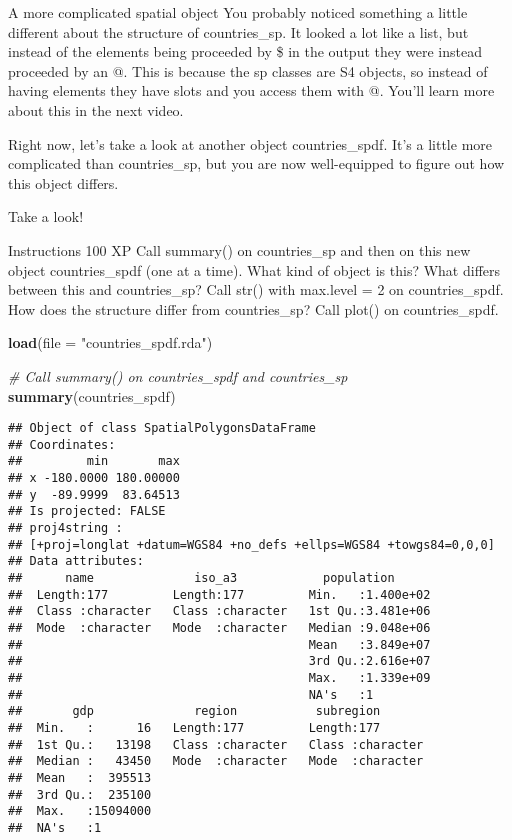\documentclass[]{article}
\newenvironment{Shaded}{\begin{snugshade}}{\end{snugshade}}
\newcommand{\CommentTok}[1]{\textcolor[rgb]{0.56,0.35,0.01}{\textit{#1}}}
\newcommand{\DataTypeTok}[1]{\textcolor[rgb]{0.13,0.29,0.53}{#1}}
\newcommand{\KeywordTok}[1]{\textcolor[rgb]{0.13,0.29,0.53}{\textbf{#1}}}
\newcommand{\NormalTok}[1]{#1}
\newcommand{\StringTok}[1]{\textcolor[rgb]{0.31,0.60,0.02}{#1}}
\begin{document}
A more complicated spatial object You probably noticed something a
little different about the structure of countries\_sp. It looked a lot
like a list, but instead of the elements being proceeded by \$ in the
output they were instead proceeded by an @. This is because the sp
classes are S4 objects, so instead of having elements they have slots
and you access them with @. You'll learn more about this in the next
video.

Right now, let's take a look at another object countries\_spdf. It's a
little more complicated than countries\_sp, but you are now
well-equipped to figure out how this object differs.

Take a look!

Instructions 100 XP Call summary() on countries\_sp and then on this new
object countries\_spdf (one at a time). What kind of object is this?
What differs between this and countries\_sp? Call str() with max.level =
2 on countries\_spdf. How does the structure differ from countries\_sp?
Call plot() on countries\_spdf.

\begin{Shaded}
\begin{Highlighting}[]
\KeywordTok{load}\NormalTok{(}\DataTypeTok{file =} \StringTok{"countries_spdf.rda"}\NormalTok{)}

\CommentTok{# Call summary() on countries_spdf and countries_sp}
\KeywordTok{summary}\NormalTok{(countries_spdf)}
\end{Highlighting}
\end{Shaded}

\begin{verbatim}
## Object of class SpatialPolygonsDataFrame
## Coordinates:
##         min       max
## x -180.0000 180.00000
## y  -89.9999  83.64513
## Is projected: FALSE 
## proj4string :
## [+proj=longlat +datum=WGS84 +no_defs +ellps=WGS84 +towgs84=0,0,0]
## Data attributes:
##      name              iso_a3            population       
##  Length:177         Length:177         Min.   :1.400e+02  
##  Class :character   Class :character   1st Qu.:3.481e+06  
##  Mode  :character   Mode  :character   Median :9.048e+06  
##                                        Mean   :3.849e+07  
##                                        3rd Qu.:2.616e+07  
##                                        Max.   :1.339e+09  
##                                        NA's   :1          
##       gdp              region           subregion        
##  Min.   :      16   Length:177         Length:177        
##  1st Qu.:   13198   Class :character   Class :character  
##  Median :   43450   Mode  :character   Mode  :character  
##  Mean   :  395513                                        
##  3rd Qu.:  235100                                        
##  Max.   :15094000                                        
##  NA's   :1
\end{verbatim}
\end{document}
